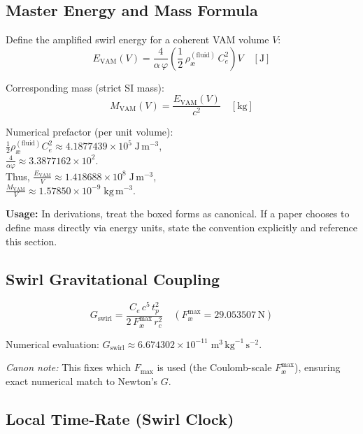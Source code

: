 \documentclass[11pt]{article}
\begin{document}
\subsection{Master Energy and Mass Formula}

Define the amplified swirl energy for a coherent VAM volume $V$:
\begin{equation}
E_{\text{VAM}}(V) = \frac{4}{\alpha\,\varphi} \left( \frac{1}{2}\,\rho_{\text{\ae}}^{(\text{fluid})}\,C_e^{2} \right) V
\quad [\text{J}]
\end{equation}

Corresponding mass (strict SI mass):
\begin{equation}
M_{\text{VAM}}(V) = \frac{E_{\text{VAM}}(V)}{c^{2}}
\quad [\text{kg}]
\end{equation}

Numerical prefactor (per unit volume):\\
$\frac{1}{2}\rho_{\text{\ae}}^{(\text{fluid})}C_e^2 \approx 4.1877439\times10^{5}\;\text{J}\,\text{m}^{-3}$,\\
$\frac{4}{\alpha\varphi} \approx 3.3877162\times10^{2}$.\\
Thus, $\frac{E_{\text{VAM}}}{V} \approx 1.418688\times10^{8}\;\text{J}\,\text{m}^{-3}$,\\
$\frac{M_{\text{VAM}}}{V} \approx 1.57850\times10^{-9}\;\text{kg}\,\text{m}^{-3}$.

\textbf{Usage:} In derivations, treat the boxed forms as canonical. If a paper chooses to define mass directly via energy units, state the convention explicitly and reference this section.

\subsection{Swirl Gravitational Coupling}

\begin{equation}
G_{\text{swirl}} = \frac{C_e\,c^{5}\,t_p^{2}}{2\,F_{\text{\ae}}^{\max}\,r_c^{2}}
\quad \left( F_{\text{\ae}}^{\max}=29.053507\,\text{N} \right)
\end{equation}

Numerical evaluation: $G_{\text{swirl}} \approx 6.674302\times10^{-11}\;\text{m}^3\,\text{kg}^{-1}\,\text{s}^{-2}$.

\textit{Canon note:} This fixes which $F_{\max}$ is used (the Coulomb-scale $F_{\text{\ae}}^{\max}$), ensuring exact numerical match to Newton’s $G$.

\subsection{Local Time-Rate (Swirl Clock)}
\end{document}
